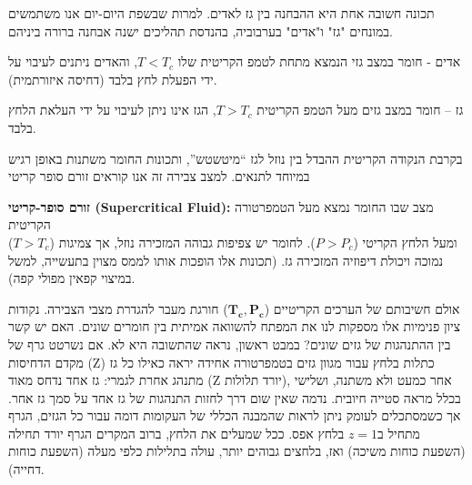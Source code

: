 \documentclass[
  hebrew,
  letterpaper,
  DIV=11,
  numbers=noendperiod]{scrreprt}
\begin{document}
תכונה חשובה אחת היא ההבחנה בין גז לאדים. למרות שבשפת היום-יום אנו
משתמשים במונחים "גז" ו"אדים" בערבוביה, בהנדסת תהליכים ישנה אבחנה ברורה
ביניהם.

אדים - חומר במצב גזי הנמצא מתחת לטמפ\textquotesingle{} הקריטית שלו
\(T < T_{c}\), והאדים ניתנים לעיבוי על ידי הפעלת לחץ בלבד (דחיסה
איזורתמית).

גז -- חומר במצב גזים מעל הטמפ\textquotesingle{} הקריטית \(T > T_{c}\),
הגז אינו ניתן לעיבוי על ידי העלאת הלחץ בלבד.

בקרבת הנקודה הקריטית ההבדל בין נוזל לגז ``מיטשטש'', ותכונות החומר משתנות
באופן רגיש במיוחד לתנאים. למצב צבירה זה אנו קוראים זורם סופר קריטי

\textbf{זורם סופר-קריטי (Supercritical Fluid):} מצב שבו החומר נמצא מעל
הטמפרטורה הקריטית\\
(\(T > T_{c}\)) ומעל הלחץ הקריטי (\(P > P_{c}\)). לחומר יש צפיפות גבוהה
המזכירה נוזל, אך צמיגות נמוכה ויכולת דיפוזיה המזכירה גז. (תכונות אלו
הופכות אותו לממס מצוין בתעשייה, למשל במיצוי קפאין מפולי קפה).

אולם חשיבותם של הערכים הקריטיים
(\(\mathbf{T}_{\mathbf{c}}\mathbf{,}\mathbf{P}_{\mathbf{c}}\)) חורגת
מעבר להגדרת מצבי הצבירה. נקודות ציון פנימיות אלו מספקות לנו את המפתח
להשוואה אמיתית בין חומרים שונים. האם יש קשר בין ההתנהגות של גזים שונים?
במבט ראשון, נראה שהתשובה היא לא. אם נשרטט גרף של מקדם הדחיסות (Z) כתלות
בלחץ עבור מגוון גזים בטמפרטורה אחידה יראה כאילו כל גז מתנהג אחרת לגמרי:
גז אחד נדחס מאוד (Z יורד תלולות), אחר כמעט ולא משתנה, ושלישי בכלל מראה
סטייה חיובית. נדמה שאין שום דרך לחזות התנהגות של גז אחד על סמך גז אחר.
אך כשמסתכלים לעומק ניתן לראות שהמבנה הכללי של העקומות דומה עבור כל
הגזים, הגרף מתחיל ב\(z = 1\) בלחץ אפס. ככל שמעלים את הלחץ, ברוב המקרים
הגרף יורד תחילה (השפעת כוחות משיכה) ואז, בלחצים גבוהים יותר, עולה
בתלילות כלפי מעלה (השפעת כוחות דחייה).
\end{document}
